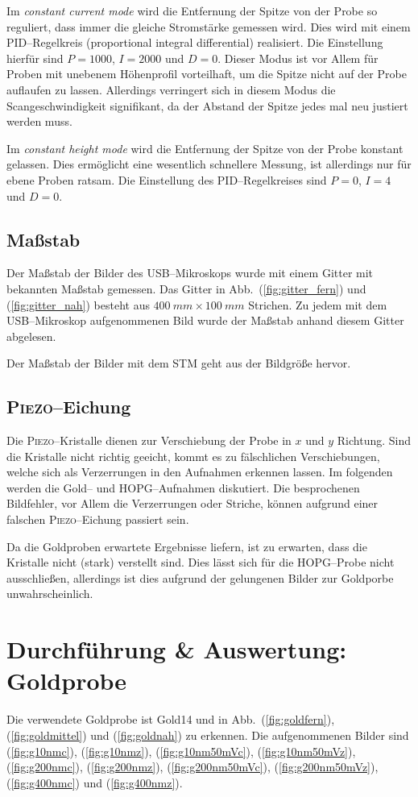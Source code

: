 \documentclass[sn-mathphys-num,iicol]{sn-jnl}
\theoremstyle{thmstyleone}
\theoremstyle{thmstyletwo}
\theoremstyle{thmstylethree}
\begin{document}
Im \textit{constant current mode} wird die Entfernung der Spitze von der Probe so reguliert, dass immer die gleiche Stromstärke gemessen wird.
Dies wird mit einem PID--Regelkreis (proportional integral differential) realisiert.
Die Einstellung hierfür sind $P=1000$, $I=2000$ und $D=0$.
Dieser Modus ist vor Allem für Proben mit unebenem Höhenprofil vorteilhaft, um die Spitze nicht auf der Probe auflaufen zu lassen.
Allerdings verringert sich in diesem Modus die Scangeschwindigkeit signifikant, da der Abstand der Spitze jedes mal neu justiert werden muss.

Im \textit{constant height mode} wird die Entfernung der Spitze von der Probe konstant gelassen.
Dies ermöglicht eine wesentlich schnellere Messung, ist allerdings nur für ebene Proben ratsam.
Die Einstellung des PID--Regelkreises sind $P=0$, $I=4$ und $D=0$.

\subsection{Maßstab}
Der Maßstab der Bilder des USB--Mikroskops wurde mit einem Gitter mit bekannten Maßstab gemessen.
Das Gitter in Abb.\ (\ref{fig:gitter_fern}) und (\ref{fig:gitter_nah}) besteht aus $\SI{400}{mm}\times \SI{100}{mm}$ Strichen.
Zu jedem mit dem USB--Mikroskop aufgenommenen Bild wurde der Maßstab anhand diesem Gitter abgelesen.

Der Maßstab der Bilder mit dem STM geht aus der Bildgröße hervor.

\subsection{\textsc{Piezo}--Eichung}
Die \textsc{Piezo}--Kristalle dienen zur Verschiebung der Probe in $x$ und $y$ Richtung.
Sind die Kristalle nicht richtig geeicht, kommt es zu fälschlichen Verschiebungen, welche sich als Verzerrungen in den Aufnahmen erkennen lassen.
Im folgenden werden die Gold-- und HOPG--Aufnahmen diskutiert.
Die besprochenen Bildfehler, vor Allem die Verzerrungen oder Striche, können aufgrund einer falschen \textsc{Piezo}--Eichung passiert sein.

Da die Goldproben erwartete Ergebnisse liefern, ist zu erwarten, dass die Kristalle nicht (stark) verstellt sind.
Dies lässt sich für die HOPG--Probe nicht ausschließen, allerdings ist dies aufgrund der gelungenen Bilder zur Goldporbe unwahrscheinlich.

\section{Durchführung \& Auswertung:\\Goldprobe}
Die verwendete Goldprobe ist \glqq Gold14\grqq{} und in Abb.\ (\ref{fig:goldfern}), (\ref{fig:goldmittel}) und (\ref{fig:goldnah}) zu erkennen.
Die aufgenommenen Bilder sind (\ref{fig:g10nmc}), (\ref{fig:g10nmz}), (\ref{fig:g10nm50mVc}), (\ref{fig:g10nm50mVz}), (\ref{fig:g200nmc}), (\ref{fig:g200nmz}), (\ref{fig:g200nm50mVc}), (\ref{fig:g200nm50mVz}), (\ref{fig:g400nmc}) und (\ref{fig:g400nmz}).
\end{document}
